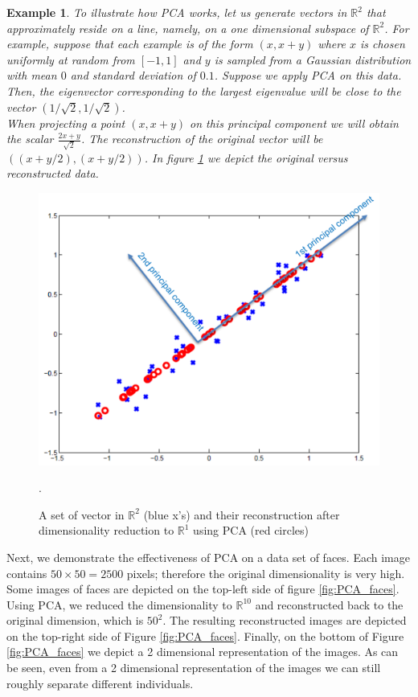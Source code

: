 \documentclass[12pt]{report}
\theoremstyle{plain}
\newtheorem{example}{Example}[chapter]
\begin{document}
\begin{flushleft}
\begin{example}
	To illustrate how PCA works, let us generate vectors in $\mathds{R}^2$ that approximately reside on a line, namely, on a one dimensional subspace of $\mathds{R}^2$. For example, suppose that each example is of the form $(x,x+y)$ where $x$ is chosen uniformly at random from $[-1,1]$ and $y$ is sampled from a Gaussian distribution with mean $0$ and standard deviation of $0.1$. Suppose we apply PCA on this data. Then, the eigenvector corresponding to the largest eigenvalue will be close to the vector $(1/\sqrt{2},1/\sqrt{2})$.\\
	When projecting a point $(x,x+y)$ on this principal component we will obtain the scalar $\frac{2x+y}{\sqrt{2}}$. The reconstruction of the original vector will be $((x+y/2),(x+y/2))$. In figure \ref{fig:PCA_R2} we depict the original versus reconstructed data.
\end{example}
\begin{figure}[!h]
	\centering
	\includegraphics[scale=1]{images/PCA_R2.pdf}
	\caption{A set of vector in $\mathds{R}^2$ (blue x's) and their reconstruction after dimensionality reduction to $\mathds{R}^1$ using PCA (red circles)}.
	\label{fig:PCA_R2}
\end{figure}
Next, we demonstrate the effectiveness of PCA on a data set of faces. Each image contains $50\times50 = 2500$ pixels; therefore the original dimensionality is very high.
Some images of faces are depicted on the top-left side of figure \ref{fig:PCA_faces}. Using PCA, we reduced the dimensionality to $\mathds{R}^10$ and reconstructed back to the original dimension, which is $50^2$. The resulting reconstructed images are depicted on the top-right side of Figure \ref{fig:PCA_faces}. Finally, on the bottom of Figure \ref{fig:PCA_faces} we depict a 2 dimensional representation of the images. As can be seen, even from a 2 dimensional representation of the images we can still roughly separate different individuals.

\end{flushleft}
\end{document}
